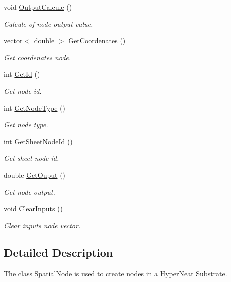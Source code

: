 \begin{DoxyCompactItemize}
void \hyperlink{class_a_n_n___u_s_m_1_1_spatial_node_a54be8fc283f882507d1b9c857ceea2ba}{Output\-Calcule} ()
\begin{DoxyCompactList}\small\item\em Calcule of node output value. \end{DoxyCompactList}\item 
vector$<$ double $>$ \hyperlink{class_a_n_n___u_s_m_1_1_spatial_node_aad2b17c6937b3517d331292625d63a48}{Get\-Coordenates} ()
\begin{DoxyCompactList}\small\item\em Get coordenates node. \end{DoxyCompactList}\item 
int \hyperlink{class_a_n_n___u_s_m_1_1_spatial_node_ae0a3083058aed45ba3bb44a3f6fd365d}{Get\-Id} ()
\begin{DoxyCompactList}\small\item\em Get node id. \end{DoxyCompactList}\item 
int \hyperlink{class_a_n_n___u_s_m_1_1_spatial_node_a56243b697d163058971480946ba4c7c9}{Get\-Node\-Type} ()
\begin{DoxyCompactList}\small\item\em Get node type. \end{DoxyCompactList}\item 
int \hyperlink{class_a_n_n___u_s_m_1_1_spatial_node_a6bb17ebc6e8e55ddfbc7f3524ab121f8}{Get\-Sheet\-Node\-Id} ()
\begin{DoxyCompactList}\small\item\em Get sheet node id. \end{DoxyCompactList}\item 
double \hyperlink{class_a_n_n___u_s_m_1_1_spatial_node_aa5f3c5395f1412e56f7becd988a8771c}{Get\-Ouput} ()
\begin{DoxyCompactList}\small\item\em Get node output. \end{DoxyCompactList}\item 
void \hyperlink{class_a_n_n___u_s_m_1_1_spatial_node_a5d7507e42443c893ba7e8c2861a0d344}{Clear\-Inputs} ()
\begin{DoxyCompactList}\small\item\em Clear inputs node vector. \end{DoxyCompactList}\end{DoxyCompactItemize}


\subsection{Detailed Description}
The class \hyperlink{class_a_n_n___u_s_m_1_1_spatial_node}{Spatial\-Node} is used to create nodes in a \hyperlink{class_a_n_n___u_s_m_1_1_hyper_neat}{Hyper\-Neat} \hyperlink{class_a_n_n___u_s_m_1_1_substrate}{Substrate}. 

